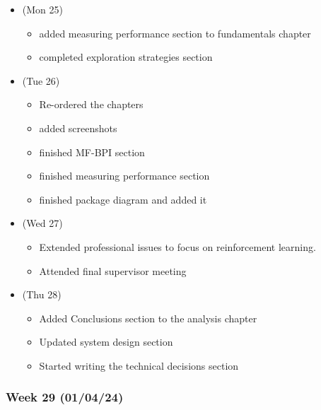 \begin{itemize}
\tightlist
\item
  (Mon 25)

  \begin{itemize}
  \tightlist
  \item
    added measuring performance section to fundamentals chapter
  \item
    completed exploration strategies section
  \end{itemize}
\item
  (Tue 26)

  \begin{itemize}
  \tightlist
  \item
    Re-ordered the chapters
  \item
    added screenshots
  \item
    finished MF-BPI section
  \item
    finished measuring performance section
  \item
    finished package diagram and added it
  \end{itemize}
\item
  (Wed 27)

  \begin{itemize}
  \tightlist
  \item
    Extended professional issues to focus on reinforcement learning.
  \item
    Attended final supervisor meeting
  \end{itemize}
\item
  (Thu 28)

  \begin{itemize}
  \tightlist
  \item
    Added Conclusions section to the analysis chapter
  \item
    Updated system design section
  \item
    Started writing the technical decisions section
  \end{itemize}
\end{itemize}

\hypertarget{week-29-010424}{%
\subsubsection{Week 29 (01/04/24)}\label{week-29-010424}}


